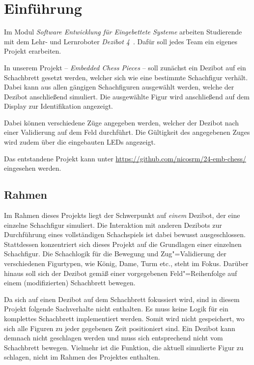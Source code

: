 
\section{Einführung}

Im Modul \emph{Software Entwicklung für Eingebettete Systeme} arbeiten Studierende mit dem Lehr- und Lernroboter \emph{Dezibot 4}~\cite{dezibotteamDezibotDezibot2025}. Dafür soll jedes Team ein eigenes Projekt erarbeiten.

In unserem Projekt -- \emph{Embedded Chess Pieces} -- soll zunächst ein Dezibot auf ein Schachbrett gesetzt werden, welcher sich wie eine bestimmte Schachfigur verhält. Dabei kann aus allen gängigen Schachfiguren ausgewählt werden, welche der Dezibot anschließend simuliert. Die ausgewählte Figur wird anschließend auf dem Display zur Identifikation angezeigt.

Dabei können verschiedene Züge angegeben werden, welcher der Dezibot nach einer Validierung auf dem Feld durchführt. Die Gültigkeit des angegebenen Zuges wird zudem über die eingebauten LEDs angezeigt.

Das entstandene Projekt kann unter \url{https://github.com/nicosrm/24-emb-chess/} eingesehen werden.


\subsection{Rahmen}

Im Rahmen dieses Projekts liegt der Schwerpunkt auf \emph{einem} Dezibot, der eine einzelne Schachfigur simuliert. Die Interaktion mit anderen Dezibots zur Durchführung eines vollständigen Schachspiels ist dabei bewusst ausgeschlossen. Stattdessen konzentriert sich dieses Projekt auf die Grundlagen einer einzelnen Schachfigur. Die Schachlogik für die Bewegung und Zug"=Validierung der verschiedenen Figurtypen, wie König, Dame, Turm etc., steht im Fokus. Darüber hinaus soll sich der Dezibot gemäß einer vorgegebenen Feld"=Reihenfolge auf einem (modifizierten) Schachbrett bewegen.


Da sich auf einen Dezibot auf dem Schachbrett fokussiert wird, sind in diesem Projekt folgende Sachverhalte nicht enthalten. Es muss keine Logik für ein komplettes Schachbrett implementiert werden. Somit wird nicht gespeichert, wo sich alle Figuren zu jeder gegebenen Zeit positioniert sind. Ein Dezibot kann demnach nicht geschlagen werden und muss sich entsprechend nicht vom Schachbrett bewegen. Vielmehr ist die Funktion, die aktuell simulierte Figur zu schlagen, nicht im Rahmen des Projektes enthalten.

